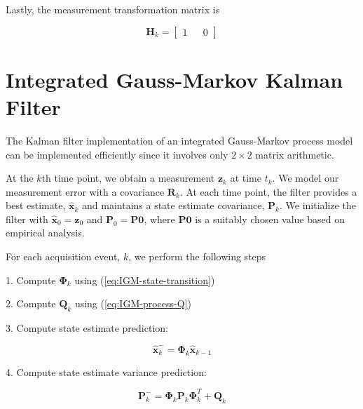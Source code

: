 \documentclass[12pt]{article}
\begin{document}
Lastly, the measurement transformation matrix is

\begin{equation}
    \mathbf{H}_k = 
    \begin{bmatrix}
    1  & &  0
    \end{bmatrix}
    \label{eq:IGM-measurement-H}
\end{equation}



%
%

\clearpage
\section{Integrated Gauss-Markov Kalman Filter}

The Kalman filter implementation of an integrated Gauss-Markov process model can be
implemented efficiently since it involves only $2 \times 2$ matrix arithmetic.

At the $k$th time point, we obtain a measurement $\mathbf{z}_k$ at time $t_k$. We model
our measurement error with a covariance $\mathbf{R}_k$. At each time point, the filter
provides a best estimate, $\hat{\mathbf{x}}_k$ and maintains a state estimate covariance,
$\mathbf{P}_k$. We initialize the filter with $\hat{\mathbf{x}}_0 = \mathbf{z}_0$ and
$\mathbf{P}_0 = \mathbf{P0}$, where $\mathbf{P0}$ is a suitably chosen value based on
empirical analysis.

For each acquisition event, $k$, we perform the following steps

1. Compute $\mathbf{\Phi}_k$ using (\ref{eq:IGM-state-transition})

2. Compute $\mathbf{Q}_k$ using (\ref{eq:IGM-process-Q})

3. Compute state estimate prediction:

\begin{equation}
    \hat{\mathbf{x}}_k^- = \mathbf{\Phi}_k \hat{\mathbf{x}}_{k-1}
    \label{eq:IGM-KF-x-prediction}
\end{equation}

4. Compute state estimate variance prediction:

\begin{equation}
    \mathbf{P}_k^- = \mathbf{\Phi}_k \mathbf{P}_k \mathbf{\Phi}_k^T + \mathbf{Q}_k
    \label{eq:IGM-KF-P-prediction}
\end{equation}
\end{document}
